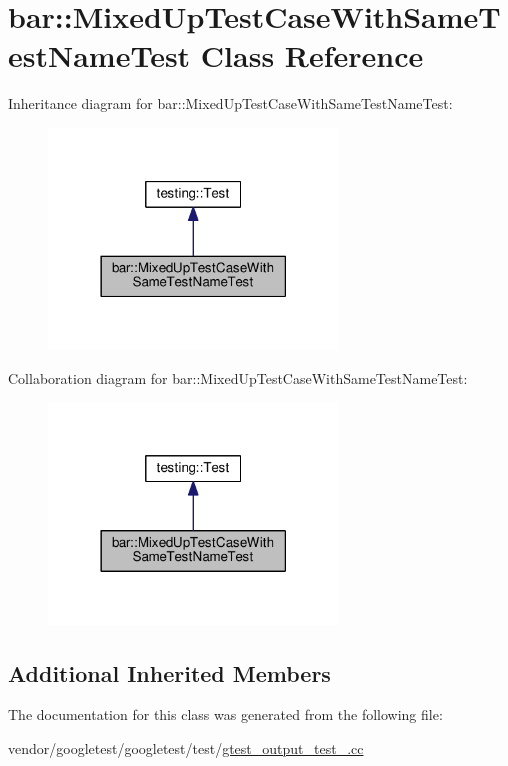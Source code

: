 \hypertarget{classbar_1_1MixedUpTestCaseWithSameTestNameTest}{}\section{bar\+:\+:Mixed\+Up\+Test\+Case\+With\+Same\+Test\+Name\+Test Class Reference}
\label{classbar_1_1MixedUpTestCaseWithSameTestNameTest}


Inheritance diagram for bar\+:\+:Mixed\+Up\+Test\+Case\+With\+Same\+Test\+Name\+Test\+:\nopagebreak
\begin{figure}[H]
\begin{center}
\leavevmode
\includegraphics[width=218pt]{classbar_1_1MixedUpTestCaseWithSameTestNameTest__inherit__graph}
\end{center}
\end{figure}


Collaboration diagram for bar\+:\+:Mixed\+Up\+Test\+Case\+With\+Same\+Test\+Name\+Test\+:\nopagebreak
\begin{figure}[H]
\begin{center}
\leavevmode
\includegraphics[width=218pt]{classbar_1_1MixedUpTestCaseWithSameTestNameTest__coll__graph}
\end{center}
\end{figure}
\subsection*{Additional Inherited Members}


The documentation for this class was generated from the following file\+:\begin{DoxyCompactItemize}
\item 
vendor/googletest/googletest/test/\hyperlink{gtest__output__test___8cc}{gtest\+\_\+output\+\_\+test\+\_\+.\+cc}\end{DoxyCompactItemize}
